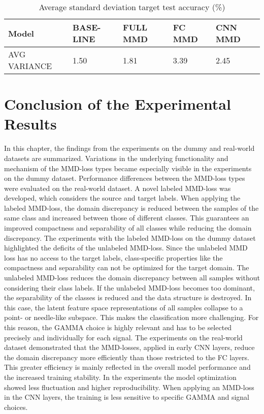 \begin {table}[H]
\centering
\begin{tabular}{lllll}
  \toprule
  Model & BASE-LINE & FULL MMD & FC MMD & CNN MMD\\
  \midrule
  AVG VARIANCE & 1.50 & 1.81 & 3.39 & 2.45\\
  \bottomrule
\end{tabular}
\caption {Average standard deviation target test accuracy (\%)} \label{tab:Average_Variance_Accuracy} 
\end {table}

\section{Conclusion of the Experimental Results}\label{sec:Performance_overview}
In this chapter, the findings from the experiments on the dummy and real-world datasets are summarized. Variations in the underlying functionality and mechanism of the MMD-loss types became especially visible in the experiments on the dummy dataset. Performance differences between the MMD-loss types were evaluated on the real-world dataset. A novel labeled MMD-loss was developed, which considers the source and target labels. When applying the labeled MMD-loss, the domain discrepancy is reduced between the samples of the same class and increased between those of different classes. This guarantees an improved compactness and separability of all classes while reducing the domain discrepancy. The experiments with the labeled MMD-loss on the dummy dataset highlighted the deficits of the unlabeled MMD-loss. Since the unlabeled MMD loss has no access to the target labels, class-specific properties like the compactness and separability can not be optimized for the target domain. The unlabeled MMD-loss reduces the domain discrepancy between all samples without considering their class labels. If the unlabeled MMD-loss becomes too dominant, the separability of the classes is reduced and the data structure is destroyed. In this case, the latent feature space representations of all samples collapse to a point- or needle-like subspace. This makes the classification more challenging. For this reason, the GAMMA choice is highly relevant and has to be selected precisely and individually for each signal. The experiments on the real-world dataset demonstrated that the MMD-losses, applied in early CNN layers, reduce the domain discrepancy more efficiently than those restricted to the FC layers. This greater efficiency is mainly reflected in the overall model performance and the increased training stability. In the experiments the model optimization showed less fluctuation and higher reproducibility. When applying an MMD-loss in the CNN layers, the training is less sensitive to specific GAMMA and signal choices. 
